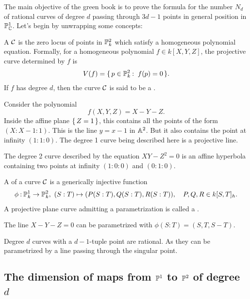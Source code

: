 \documentclass[12pt]{memoir}
\begin{document}
The main objective of the green book is to prove the formula for the number $N_d$ of rational curves of degree $d$ passing through $3d-1$ points in general position in $\mathbb{P}_{\mathbb{C}}^1$. Let's begin by unwrapping some concepts:

\begin{Def}
A  $\mathcal{C}$ is the zero locus of points in $\mathbb{P}^2_k$ which satisfy a homogeneous polynomial equation. Formally, for a homogeneous polynomial $f\in k[X,Y,Z]$, the projective curve determined by $f$ is
$$V(f)=\set{p\in\bP^2_k\:\ f(p)=0}.$$
If $f$ has degree $d$, then the curve $\mathcal{C}$ is said to be a .
\end{Def}

\begin{Ex}
Consider the polynomial 
$$f(X,Y,Z)=X-Y-Z.$$
Inside the affine plane $\{\,Z=1\,\}$, this contains all the points of the form $(X:X-1:1)$. This is the line $y=x-1$ in $\mathbb{A}^2$. But it also contains the point at infinity $(1:1:0)$. The degree 1 curve being described here is a projective line.
\end{Ex}

\begin{Ex}
    The degree 2 curve described by the equation $XY-Z^2=0$ is an affine hyperbola containing two points at infinity $(1:0:0)$ and $(0:1:0)$. 
\end{Ex}

\begin{Def}
A  of a curve $\mathcal{C}$ is a generically injective function $$\phi\:\bP^1_k\to\bP^2_k,\ (S:T)\mapsto(P(S:T),Q(S:T),R(S:T)),\quad P,Q,R\in k[S,T]_h.$$
A projective plane curve admitting a parametrization is called a .
\end{Def}

\begin{Ex}
    The line $X-Y-Z=0$ can be parametrized with $\phi(S:T)=(S,T,S-T)$. 
\end{Ex}

\begin{Ex}
    Degree $d$ curves with a $d-1$-tuple point are rational. As they can be parametrized by a line passing through the singular point. 
\end{Ex}

\subsection{The dimension of maps from $\mathbb{P}^1$ to $\mathbb{P}^2$ of degree $d$}
\end{document}
